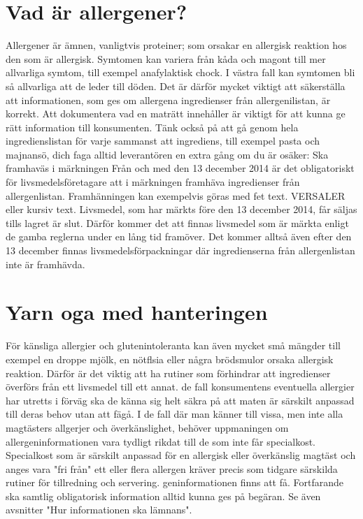 \section*{Vad är allergener?}
Allergener är ämnen, vanligtvis proteiner; som orsakar en allergisk reaktion hos den som är allergisk. Symtomen kan variera från kåda och magont till mer allvarliga symtom, till exempel anafylaktisk chock.
I västra fall kan symtomen bli så allvarliga att de leder till döden. Det är därför mycket viktigt att säkerställa att informationen, som ges om allergena ingredienser från allergenilistan, är korrekt. Att dokumentera vad en maträtt innehåller är viktigt för att kunna ge rätt information till konsumenten. Tänk också på att gå genom hela ingredienslistan för varje sammanst att ingrediens, till exempel pasta och majnansö, dich faga alltid leverantören en extra gång om du är osäker:
Ska framhaväs i märkningen
Från och med den 13 december 2014 är det obligatoriskt för livsmedelsföretagare att i märkningen framhäva ingredienser från allergenlistan. Framhänningen kan exempelvis göras med fet text. VERSALER eller kursiv text. Livsmedel, som har märkts före den 13 december 2014, får säljas tills lagret är slut. Därför kommer det att finnas livsmedel som är märkta enligt de gamba reglerna under en lång tid framöver. Det kommer alltså även efter den 13 december finnas livsmedelsförpackningar där ingredienserna från allergenlistan inte är framhävda.
\section*{Yarn oga med hanteringen}
För känsliga allergier och glutenintoleranta kan även mycket små mängder till exempel en droppe mjölk, en nötflsia eller några brödsmulor orsaka allergisk reaktion. Därför är det viktig att ha rutiner som förhindrar att ingredienser överförs från ett livsmedel till ett annat.
de fall konsumentens eventuella allergier har utretts i förväg ska de känna sig helt säkra på att maten är särskilt anpassad till deras behov utan att fägå. I de fall där man känner till vissa, men inte alla magtästers allgerjer och överkänslighet, behöver uppmaningen om allergeninformationen vara tydligt rikdat till de som inte får specialkost. Specialkost som är särskilt anpassad för en allergisk eller överkänslig magtäst och anges vara "fri från" ett eller flera allergen kräver precis som tidgare särskilda rutiner för tillredning och servering.
geninformationen finns att få. Fortfarande ska samtlig obligatorisk information alltid kunna ges på begäran. Se även avsnitter "Hur informationen ska lämnans".
